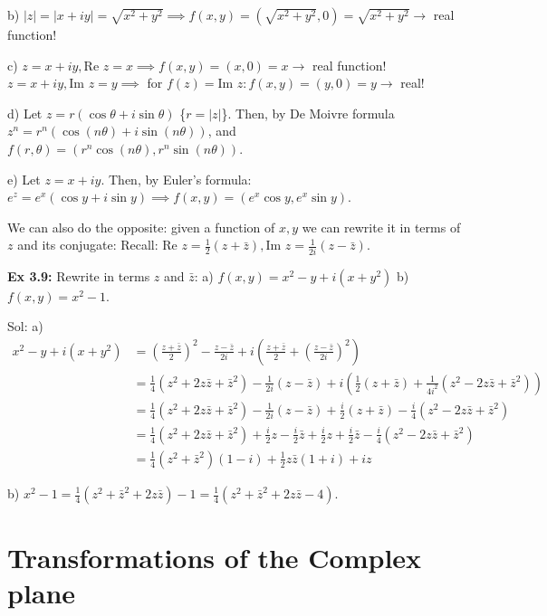 \documentclass{article}
\begin{document}
b) $\vert z\vert  = \vert x + iy\vert  = \sqrt{x^2 + y^2} \implies f(x, y) = (\sqrt{x^2 + y^2}, 0) = \sqrt{x^2 + y^2} \to$ real function!

c) $z = x + iy, \text{Re } z = x \implies f(x, y) = (x, 0) = x \to$ real function!
$z = x + iy, \text{Im } z = y \implies$ for $f(z) = \text{Im } z: f(x, y) = (y, 0) = y \to$ real!

d) Let $z = r(\cos \theta + i\sin \theta)$ \{$r = \vert z\vert $\}. Then, by De Moivre formula $z^n = r^n(\cos(n\theta) + i\sin(n\theta))$, and $f(r, \theta) = (r^n \cos(n\theta), r^n \sin(n\theta))$.

e) Let $z = x + iy$. Then, by Euler's formula: $e^z = e^x(\cos y + i\sin y) \implies f(x, y) = (e^x \cos y, e^x \sin y)$.

We can also do the opposite: given a function of $x, y$ we can rewrite it in terms of $z$ and its conjugate:
Recall: $\text{Re } z = \frac{1}{2}(z + \bar{z}), \text{Im } z = \frac{1}{2i}(z - \bar{z})$.

\textbf{Ex 3.9:} Rewrite in terms $z$ and $\bar{z}$:
a) $f(x, y) = x^2 - y + i(x + y^2)$ b) $f(x, y) = x^2 - 1$.

Sol: a)
\begin{align*}
x^2 - y + i(x + y^2) &= \left(\frac{z + \bar{z}}{2}\right)^2 - \frac{z - \bar{z}}{2i} + i\left(\frac{z + \bar{z}}{2} + \left(\frac{z - \bar{z}}{2i}\right)^2\right) \\
&= \frac{1}{4}(z^2 + 2z\bar{z} + \bar{z}^2) - \frac{1}{2i}(z - \bar{z}) + i\left(\frac{1}{2}(z + \bar{z}) + \frac{1}{4i^2}(z^2 - 2z\bar{z} + \bar{z}^2)\right) \\
&= \frac{1}{4}(z^2 + 2z\bar{z} + \bar{z}^2) - \frac{1}{2i}(z - \bar{z}) + \frac{i}{2}(z + \bar{z}) - \frac{i}{4}(z^2 - 2z\bar{z} + \bar{z}^2) \\
&= \frac{1}{4}(z^2 + 2z\bar{z} + \bar{z}^2) + \frac{i}{2}z - \frac{i}{2}\bar{z} + \frac{i}{2}z + \frac{i}{2}\bar{z} - \frac{i}{4}(z^2 - 2z\bar{z} + \bar{z}^2) \\
&= \frac{1}{4}(z^2 + \bar{z}^2)(1 - i) + \frac{1}{2}z\bar{z}(1 + i) + iz
\end{align*}

b) $x^2 - 1 = \frac{1}{4}(z^2 + \bar{z}^2 + 2z\bar{z}) - 1 = \frac{1}{4}(z^2 + \bar{z}^2 + 2z\bar{z} - 4)$.

\section{Transformations of the Complex plane}
\end{document}
